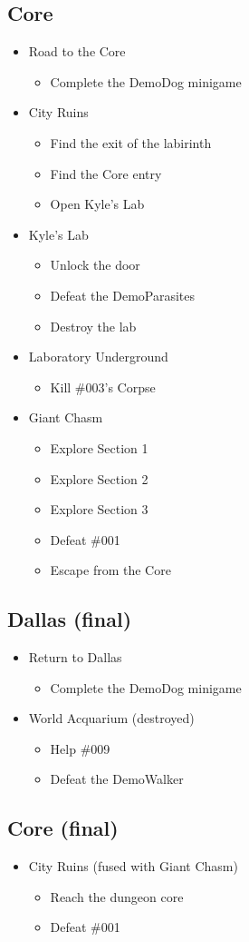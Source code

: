 \subsection{Core}
\begin{itemize}
	\item Road to the Core
	\begin{itemize}	
		\item Complete the DemoDog minigame
	\end{itemize}
	\item City Ruins
	\begin{itemize}
		\item Find the exit of the labirinth
		\item Find the Core entry 
		\item Open Kyle's Lab
	\end{itemize}
	\item Kyle's Lab
	\begin{itemize}
		\item Unlock the door
		\item Defeat the DemoParasites
		\item Destroy the lab
	\end{itemize}
	\item Laboratory Underground
	\begin{itemize}
		\item Kill \#003's Corpse
	\end{itemize}
	\item Giant Chasm
	\begin{itemize}
		\item Explore Section 1
		\item Explore Section 2
		\item Explore Section 3
		\item Defeat \#001
		\item Escape from the Core
	\end{itemize}
\end{itemize}

\subsection{Dallas (final)}
\begin{itemize}
	\item Return to Dallas
	\begin{itemize}	
		\item Complete the DemoDog minigame
	\end{itemize}
	\item World Acquarium (destroyed)
	\begin{itemize}
		\item Help \#009
		\item Defeat the DemoWalker
	\end{itemize}
\end{itemize}

\subsection{Core (final)}
\begin{itemize}
	\item City Ruins (fused with Giant Chasm)
	\begin{itemize}
		\item Reach the dungeon core
		\item Defeat \#001 
	\end{itemize}
\end{itemize}


